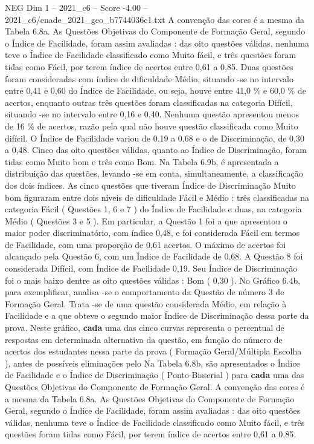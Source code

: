 \begin{textsample}{NEG Dim 1 – 2021\_c6 – Score -4.00 – 2021\_c6/enade\_2021\_geo\_b7744036e1.txt}
A convenção das cores é a mesma da Tabela 6.8a.
As Questões Objetivas do Componente de Formação Geral, segundo o Índice de Facilidade, foram assim avaliadas : das oito questões válidas, nenhuma teve o Índice de Facilidade classificado como Muito fácil, e três questões foram tidas como Fácil, por terem índice de acertos entre 0,61 a 0,85.
Duas questões foram consideradas com índice de dificuldade Médio, situando -se no intervalo entre 0,41 e 0,60 do Índice de Facilidade, ou seja, houve entre 41,0 \% e 60,0 \% de acertos, enquanto outras três questões foram classificadas na categoria Difícil, situando -se no intervalo entre 0,16 e 0,40.
Nenhuma questão apresentou menos de 16 \% de acertos, razão pela qual não houve questão classificada como Muito difícil.
O Índice de Facilidade variou de 0,19 a 0,68 e o de Discriminação, de 0,30 a 0,48.
Cinco das oito questões válidas, quanto ao Índice de Discriminação, foram tidas como Muito bom e três como Bom.
Na Tabela 6.9b, é apresentada a distribuição das questões, levando -se em conta, simultaneamente, a classificação dos dois índices.
As cinco questões que tiveram Índice de Discriminação Muito bom figuraram entre dois níveis de dificuldade Fácil e Médio : três classificadas na categoria Fácil ( Questões 1, 6 e 7 ) do Índice de Facilidade e duas, na categoria Médio ( Questões 3 e 5 ).
Em particular, a Questão 1 foi a que apresentou o maior poder discriminatório, com índice 0,48, e foi considerada Fácil em termos de Facilidade, com uma proporção de 0,61 acertos.
O máximo de acertos foi alcançado pela Questão 6, com um Índice de Facilidade de 0,68.
A Questão 8 foi considerada Difícil, com Índice de Facilidade 0,19.
Seu Índice de Discriminação foi o mais baixo dentre as oito questões válidas : Bom ( 0,30 ).
No Gráfico 6.4b, para exemplificar, analisa -se o comportamento da Questão de número 3 de Formação Geral.
Trata -se de uma questão considerada Médio, em relação à Facilidade e a que obteve o segundo maior Índice de Discriminação dessa parte da prova.
Neste gráfico, \textbf{cada} uma das cinco curvas representa o percentual de respostas em determinada alternativa da questão, em função do número de acertos dos estudantes nessa parte da prova ( Formação Geral/Múltipla Escolha ), antes de possíveis eliminações pelo Na Tabela 6.8b, são apresentados o Índice de Facilidade e o Índice de Discriminação ( Ponto-Bisserial ) para \textbf{cada} uma das Questões Objetivas do Componente de Formação Geral.
A convenção das cores é a mesma da Tabela 6.8a.
As Questões Objetivas do Componente de Formação Geral, segundo o Índice de Facilidade, foram assim avaliadas : das oito questões válidas, nenhuma teve o Índice de Facilidade classificado como Muito fácil, e três questões foram tidas como Fácil, por terem índice de acertos entre 0,61 a 0,85.

\end{textsample}
